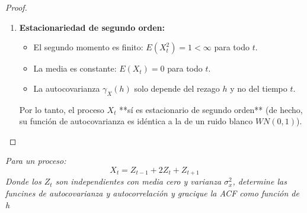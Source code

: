 \documentclass[11pt,letterpaper]{article}
\begin{document}
\begin{proof}
\begin{enumerate}
    Por simetría, $\gamma_X(h) = \gamma_X(-h)$. Así, la función de autocovarianza es:
    \[
    \gamma_X(h) = 
    \begin{cases} 
    1 & \text{si } h = 0 \\ 
    0 & \text{si } h \neq 0 
    \end{cases}
    \]

    \item \textbf{Estacionariedad de segundo orden:}
    \begin{itemize}
        \item El segundo momento es finito: $E(X_t^2) = 1 < \infty$ para todo $t$.
        \item La media es constante: $E(X_t) = 0$ para todo $t$.
        \item La autocovarianza $\gamma_X(h)$ solo depende del rezago $h$ y no del tiempo $t$.
    \end{itemize}

    Por lo tanto, el proceso $X_t$ **sí es estacionario de segundo orden** (de hecho, su función de autocovarianza es idéntica a la de un ruido blanco $WN(0,1)$).
\end{enumerate}
\end{proof}
\begin{tcolorbox}[
	title = \textcolor{black}{\textcolor{white}{Problema 10}},]
\textit{Para un proceso:\,\\
\begin{equation*}
    X_t=Z_{t-1}+2Z_{t}+Z_{t+1}
\end{equation*}
Donde los $Z_t$ son independientes con media cero y varianza $\sigma_x^2$, determine las funcines de autocovarianza y autocorrelaci\'on y gracique la ACF como funci\'on de h}
\end{tcolorbox}
\end{document}
